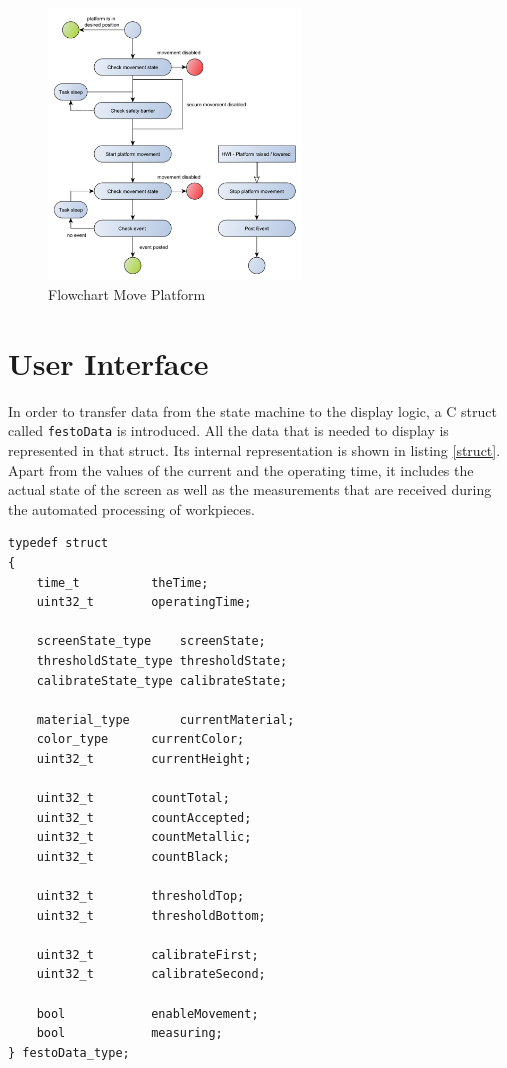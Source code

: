 \begin{figure}[H]
	\begin{center}
		\includegraphics[width=0.6\textwidth]{media/Flow_Chart_MovePlatform.pdf} 	
		\caption{Flowchart Move Platform}
		\label{fig:moveplatform}
	\end{center}
\end{figure}



\section{User Interface} \label{sec:ui}%

In order to transfer data from the state machine to the display logic, a C struct called \texttt{festoData} is introduced. All the data that is needed to display is represented in that struct. Its internal representation is shown in listing \ref{struct}. Apart from the values of the current and the operating time, it includes the actual state of the screen as well as the measurements that are received during the automated processing of workpieces.

\begin{lstlisting}[label=struct, caption=festoData struct, style=customc]
typedef struct
{
	time_t 			theTime;
	uint32_t 		operatingTime;
	
	screenState_type 	screenState;
	thresholdState_type	thresholdState;
	calibrateState_type	calibrateState;
	
	material_type 		currentMaterial;
	color_type 		currentColor;
	uint32_t 		currentHeight;
	
	uint32_t		countTotal;
	uint32_t 		countAccepted;
	uint32_t 		countMetallic;
	uint32_t 		countBlack;
	
	uint32_t 		thresholdTop;
	uint32_t 		thresholdBottom;
	
	uint32_t 		calibrateFirst;
	uint32_t 		calibrateSecond;
	
	bool 			enableMovement;
	bool 			measuring;
} festoData_type;
\end{lstlisting}

